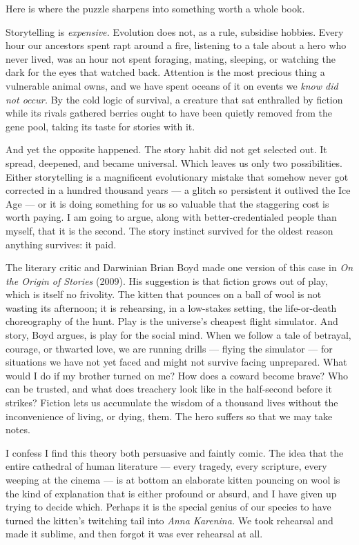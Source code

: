 Here is where the puzzle sharpens into something worth a whole book.

Storytelling is \emph{expensive.} Evolution does not, as a rule, subsidise hobbies. Every hour our ancestors spent rapt around a fire, listening to a tale about a hero who never lived, was an hour not spent foraging, mating, sleeping, or watching the dark for the eyes that watched back. Attention is the most precious thing a vulnerable animal owns, and we have spent oceans of it on events we \emph{know did not occur.} By the cold logic of survival, a creature that sat enthralled by fiction while its rivals gathered berries ought to have been quietly removed from the gene pool, taking its taste for stories with it.

And yet the opposite happened. The story habit did not get selected out. It spread, deepened, and became universal. Which leaves us only two possibilities. Either storytelling is a magnificent evolutionary mistake that somehow never got corrected in a hundred thousand years — a glitch so persistent it outlived the Ice Age — or it is doing something for us so valuable that the staggering cost is worth paying. I am going to argue, along with better-credentialed people than myself, that it is the second. The story instinct survived for the oldest reason anything survives: it paid.

The literary critic and Darwinian Brian Boyd made one version of this case in \emph{On the Origin of Stories} (2009). His suggestion is that fiction grows out of play, which is itself no frivolity. The kitten that pounces on a ball of wool is not wasting its afternoon; it is rehearsing, in a low-stakes setting, the life-or-death choreography of the hunt. Play is the universe's cheapest flight simulator. And story, Boyd argues, is play for the social mind. When we follow a tale of betrayal, courage, or thwarted love, we are running drills — flying the simulator — for situations we have not yet faced and might not survive facing unprepared. What would I do if my brother turned on me? How does a coward become brave? Who can be trusted, and what does treachery look like in the half-second before it strikes? Fiction lets us accumulate the wisdom of a thousand lives without the inconvenience of living, or dying, them. The hero suffers so that we may take notes.

I confess I find this theory both persuasive and faintly comic. The idea that the entire cathedral of human literature — every tragedy, every scripture, every weeping at the cinema — is at bottom an elaborate kitten pouncing on wool is the kind of explanation that is either profound or absurd, and I have given up trying to decide which. Perhaps it is the special genius of our species to have turned the kitten's twitching tail into \emph{Anna Karenina.} We took rehearsal and made it sublime, and then forgot it was ever rehearsal at all.

